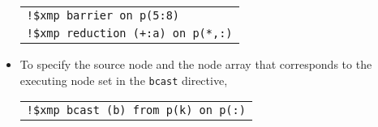 \begin{itemize}

\begin{tabular}{l}
\verb|!$xmp barrier on p(5:8)| \\
\verb|!$xmp reduction (+:a) on p(*,:)| \\
\end{tabular}

\item To specify the source node and the node array that corresponds to
      the executing node set in the {\tt bcast} directive,


\begin{tabular}{l}
\verb|!$xmp bcast (b) from p(k) on p(:)| \\
\end{tabular}
\end{itemize}
